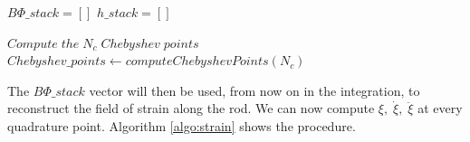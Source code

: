 \documentclass[12pt,a4paper]{article}
\begin{document}
\begin{algorithm}
\caption{The algorithm for computing the strains at every quadrature point}\label{algo:BPhi}


$B\Phi\_stack = []$\;
$h\_stack = []$\;\;

$Compute \; the \; N_c \; Chebyshev \; points$\;
$Chebyshev\_points \leftarrow computeChebyshevPoints\left( N_c \right)$\;\;

\For{$i \in \left[0, N_c - 1 \right)$}{\;

	$begin = Chebyshev\_points \left[ (N_c-1) - i \right]$\;
    	$end = Chebyshev\_points \left[ (N_c-1) - (i + 1) \right]$\;\;
    	
    	$h = end - begin$\;
    	$step = \sqrt{15}/10$\;\;
    	
    	
    	$h\_stack[i] = h$\;\;

    	$x_1 = begin + (0.5 - step)*h$\;
    	$x_2 = begin + 0.5*h$\;
	$x_3 = begin + (0.5 + step)*h$\;\;
	
	
	$B\Phi_{(x_1)} = B \Phi_{(x_1)}$	\;
	$B\Phi_{(x_2)} = B \Phi_{(x_2)}$	\;
	$B\Phi_{(x_3)} = B \Phi_{(x_3)}$	\;
	$B\Phi\_stack[i] = \{\begin{matrix}B\Phi_{(x_1)} & B\Phi_{(x_2)} & B\Phi_{(x_3)} \end{matrix} \}$\;\;
	
	
		
	
}\;

\end{algorithm}

The $B\Phi\_stack$ vector will then be used, from now on in the integration, to reconstruct the field of strain along the rod.
We can now compute $\xi, \; \dot{\xi}, \; \ddot{\xi}$ at every quadrature point. Algorithm \ref{algo:strain} shows the procedure.
\end{document}
